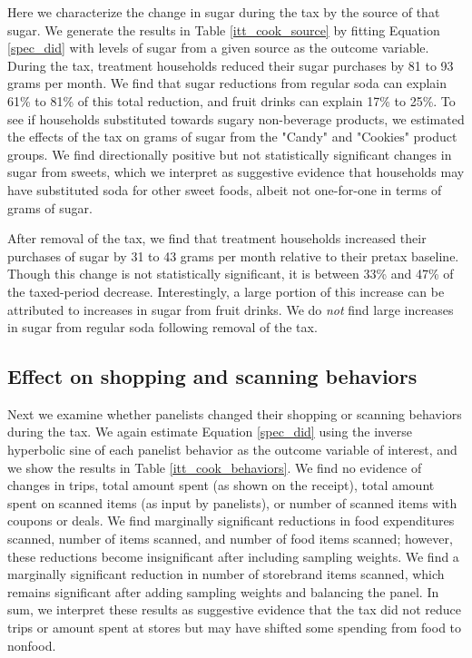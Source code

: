 \documentclass[12pt]{article}
\begin{document}
Here we characterize the change in sugar during the tax by the source of that sugar. We generate the results in Table \ref{itt_cook_source} by fitting Equation \ref{spec_did} with levels of sugar from a given source as the outcome variable. During the tax, treatment households reduced their sugar purchases by 81 to 93 grams per month. We find that sugar reductions from regular soda can explain 61\% to 81\% of this total reduction, and fruit drinks can explain 17\% to 25\%. To see if households substituted towards sugary non-beverage products, we estimated the effects of the tax on grams of sugar from the "Candy" and "Cookies" product groups. We find directionally positive but not statistically significant changes in sugar from sweets, which we interpret as suggestive evidence that households may have substituted soda for other sweet foods, albeit not one-for-one in terms of grams of sugar.

After removal of the tax, we find that treatment households increased their purchases of sugar by 31 to 43 grams per month relative to their pretax baseline. Though this change is not statistically significant, it is between 33\% and 47\% of the taxed-period decrease. Interestingly, a large portion of this increase can be attributed to increases in sugar from fruit drinks. We do \textit{not} find large increases in sugar from regular soda following removal of the tax.

\subsection{Effect on shopping and scanning behaviors}

Next we examine whether panelists changed their shopping or scanning behaviors during the tax. We again estimate Equation \ref{spec_did} using the inverse hyperbolic sine of each panelist behavior as the outcome variable of interest, and we show the results in Table \ref{itt_cook_behaviors}. We find no evidence of changes in trips, total amount spent (as shown on the receipt), total amount spent on scanned items (as input by panelists), or number of scanned items with coupons or deals. We find marginally	significant reductions in food expenditures scanned, number of items scanned, and number of food items scanned; however, these reductions become insignificant after including sampling weights. We find a marginally significant reduction in number of storebrand items scanned, which remains significant after adding sampling weights and balancing the panel. In sum, we interpret these results as suggestive evidence that the tax did not reduce trips or amount spent at stores but may have shifted some spending from food to nonfood.
\end{document}
